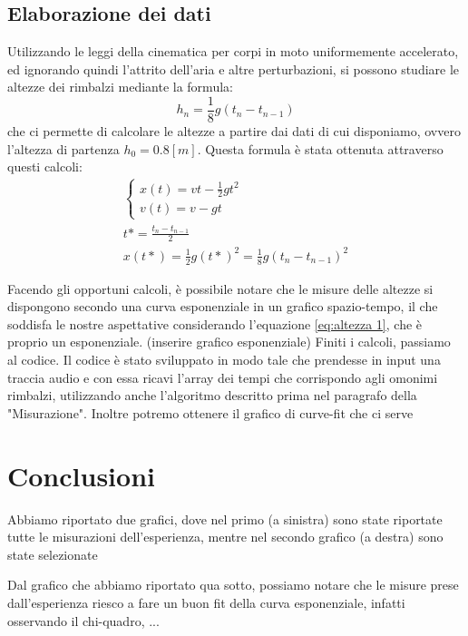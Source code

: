 \documentclass[a4paper]{article}
\begin{document}
    \subsection{Elaborazione dei dati}
    Utilizzando le leggi della cinematica per corpi in moto uniformemente accelerato, ed ignorando quindi l'attrito dell'aria e altre perturbazioni, si possono studiare le altezze dei rimbalzi mediante la formula:
    \begin{equation}
        \label{eq:altezza 2}
        h_n=\frac{1}{8}g\left( t_n-t_{n-1} \right) 
    \end{equation}
    che ci permette di calcolare le altezze a partire dai dati di cui disponiamo, ovvero l'altezza di partenza $h_0 = 0.8[m]$.
    Questa formula è stata ottenuta attraverso questi calcoli:
    \begin{gather*}
        \label{eq:calcoli}
        \begin{cases}
          x(t) = vt - \frac{1}{2} g t^2 \\
          v(t) = v - gt
        \end{cases} \\
        t* = \frac{t_n - t_{n-1}}{2} \\
        x(t*) = \frac{1}{2} g (t*)^2 = \frac{1}{8} g (t_n - t_{n-1})^2
    \end{gather*}
    
    Facendo gli opportuni calcoli, è possibile notare che le misure delle altezze si dispongono secondo una curva esponenziale in un grafico spazio-tempo, il che soddisfa le nostre aspettative considerando l'equazione \ref{eq:altezza 1}, che è proprio un esponenziale.
    (inserire grafico esponenziale)
    Finiti i calcoli, passiamo al codice. Il codice è stato sviluppato in modo tale che prendesse in input una traccia audio e con essa ricavi l'array dei tempi che corrispondo agli omonimi rimbalzi, utilizzando anche l'algoritmo descritto prima nel paragrafo della "Misurazione". Inoltre potremo ottenere il grafico di curve-fit che ci serve
    
    \section{Conclusioni}
    Abbiamo riportato due grafici, dove nel primo (a sinistra) sono state riportate tutte le misurazioni dell'esperienza, mentre nel secondo grafico (a destra) sono state selezionate
    
    Dal grafico che abbiamo riportato qua sotto, possiamo notare che le misure prese dall'esperienza riesco a fare un buon fit della curva esponenziale, infatti osservando il chi-quadro, ...
\end{document}
